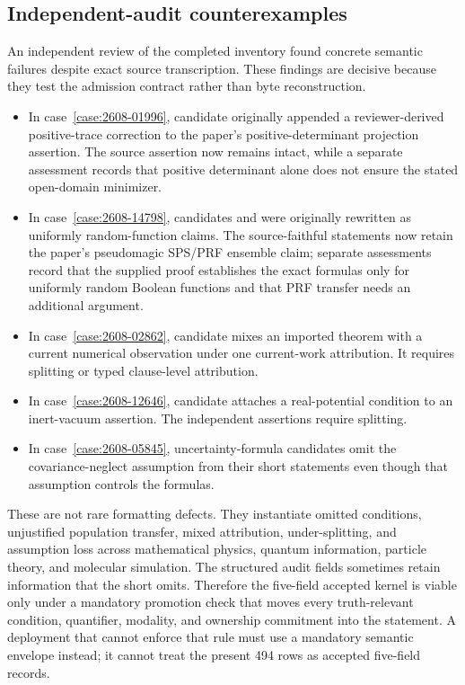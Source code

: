 \subsection{Independent-audit counterexamples}

An independent review of the completed inventory found concrete semantic failures despite exact source transcription. These findings are decisive because they test the admission contract rather than byte reconstruction.

\begin{itemize}
  \item In case~\ref{case:2608-01996}, candidate  originally appended a reviewer-derived positive-trace correction to the paper's positive-determinant projection assertion. The source assertion now remains intact, while a separate assessment records that positive determinant alone does not ensure the stated open-domain minimizer.
  \item In case~\ref{case:2608-14798}, candidates  and  were originally rewritten as uniformly random-function claims. The source-faithful statements now retain the paper's pseudomagic SPS/PRF ensemble claim; separate assessments record that the supplied proof establishes the exact formulas only for uniformly random Boolean functions and that PRF transfer needs an additional argument.
  \item In case~\ref{case:2608-02862}, candidate  mixes an imported theorem with a current numerical observation under one current-work attribution. It requires splitting or typed clause-level attribution.
  \item In case~\ref{case:2608-12646}, candidate  attaches a real-potential condition to an inert-vacuum assertion. The independent assertions require splitting.
  \item In case~\ref{case:2608-05845}, uncertainty-formula candidates omit the covariance-neglect assumption from their short statements even though that assumption controls the formulas.
\end{itemize}

These are not rare formatting defects. They instantiate omitted conditions, unjustified population transfer, mixed attribution, under-splitting, and assumption loss across mathematical physics, quantum information, particle theory, and molecular simulation. The structured audit fields sometimes retain information that the short  omits. Therefore the five-field accepted kernel is viable only under a mandatory promotion check that moves every truth-relevant condition, quantifier, modality, and ownership commitment into the statement. A deployment that cannot enforce that rule must use a mandatory semantic envelope instead; it cannot treat the present 494 rows as accepted five-field records.

